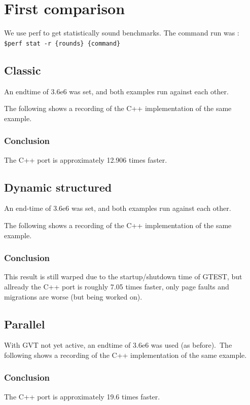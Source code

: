 \documentclass[8pt,a4paper]{report}
\begin{document}
\section{First comparison}
We use perf to get statistically sound benchmarks. The command run was :
\lstinline!$perf stat -r {rounds} {command}!\\

\subsection{Classic}
An endtime of 3.6e6 was set, and both examples run against each other.

The following shows a recording of the C++ implementation of the same example.\\

\subsubsection{Conclusion}
The C++ port is approximately 12.906 times faster.

\subsection{Dynamic structured}
An end-time of 3.6e6 was set, and both examples run against each other.

The following shows a recording of the C++ implementation of the same example.\\

\subsubsection{Conclusion}
This result is still warped due to the startup/shutdown time of GTEST, but allready the C++ port is roughly 7.05 times faster, only page faults and migrations are worse (but being worked on).
\subsection{Parallel}
With GVT not yet active, an endtime of 3.6e6 was used (as before).\
The following shows a recording of the C++ implementation of the same example.\\

\subsubsection{Conclusion}
The C++ port is approximately 19.6 times faster.
\end{document}
